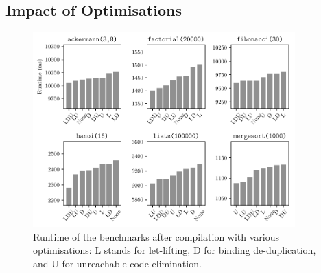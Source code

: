\documentclass[dissertation.tex]{subfiles}
\begin{document}
{{    }
    \subsection{Impact of Optimisations}
    {


        \begin{figure}[h]
            \centering
            \captionsetup{width=0.8\textwidth}
            \includegraphics[width=0.9\textwidth]{graphs/perf_by_opt.pdf}
            \caption{Runtime of the benchmarks after compilation with various optimisations: L stands for let-lifting, D for binding de-duplication, and U for unreachable code elimination.}
            \label{fig:opt-perf}
        \end{figure}
        

    }
}
\end{document}
